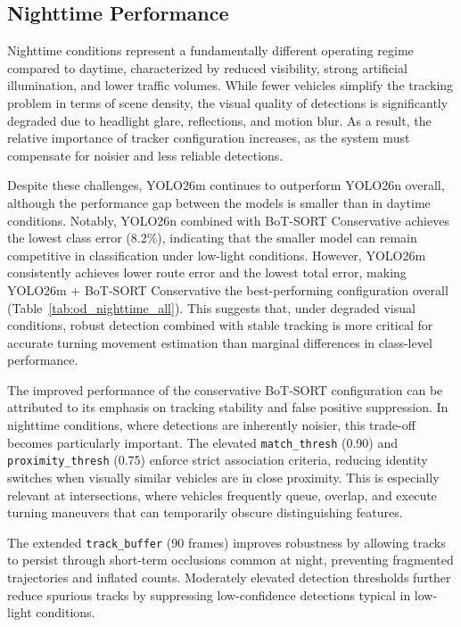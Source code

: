 \subsection{Nighttime Performance}

Nighttime conditions represent a fundamentally different operating regime compared to daytime, characterized by reduced visibility, strong artificial illumination, and lower traffic volumes. While fewer vehicles simplify the tracking problem in terms of scene density, the visual quality of detections is significantly degraded due to headlight glare, reflections, and motion blur. As a result, the relative importance of tracker configuration increases, as the system must compensate for noisier and less reliable detections.

Despite these challenges, YOLO26m continues to outperform YOLO26n overall, although the performance gap between the models is smaller than in daytime conditions. Notably, YOLO26n combined with BoT-SORT Conservative achieves the lowest class error (8.2\%), indicating that the smaller model can remain competitive in classification under low-light conditions. However, YOLO26m consistently achieves lower route error and the lowest total error, making YOLO26m + BoT-SORT Conservative the best-performing configuration overall (Table~\ref{tab:od_nighttime_all}). This suggests that, under degraded visual conditions, robust detection combined with stable tracking is more critical for accurate turning movement estimation than marginal differences in class-level performance.

The improved performance of the conservative BoT-SORT configuration can be attributed to its emphasis on tracking stability and false positive suppression. In nighttime conditions, where detections are inherently noisier, this trade-off becomes particularly important. The elevated \texttt{match\_thresh} (0.90) and \texttt{proximity\_thresh} (0.75) enforce strict association criteria, reducing identity switches when visually similar vehicles are in close proximity. This is especially relevant at intersections, where vehicles frequently queue, overlap, and execute turning maneuvers that can temporarily obscure distinguishing features.

The extended \texttt{track\_buffer} (90 frames) improves robustness by allowing tracks to persist through short-term occlusions common at night, preventing fragmented trajectories and inflated counts. Moderately elevated detection thresholds further reduce spurious tracks by suppressing low-confidence detections typical in low-light conditions.

